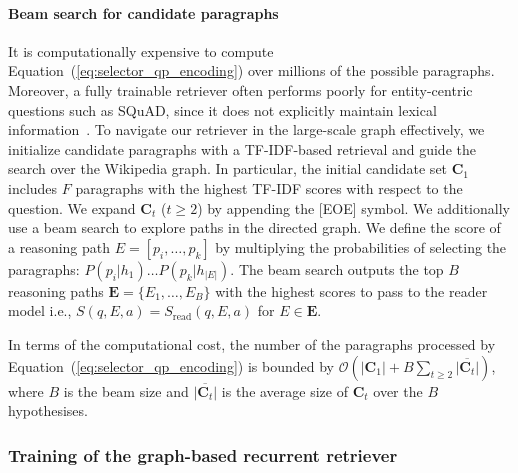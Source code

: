 \vspace{-2mm}\paragraph{Beam search for candidate paragraphs}
It is computationally expensive to compute Equation~(\ref{eq:selector_qp_encoding}) over millions of the possible paragraphs. Moreover, a fully trainable retriever often performs poorly for entity-centric questions such as SQuAD, since it does not explicitly maintain lexical information~\citep{lee-chang-toutanova:2019:ACL2019}.
To navigate our retriever in the large-scale graph effectively, we initialize candidate paragraphs with a TF-IDF-based retrieval and guide the search over the Wikipedia graph.
In particular, the initial candidate set $\mathbf{C}_1$ includes $F$ paragraphs with the highest TF-IDF scores with respect to the question.
We expand $\mathbf{C}_t$ ($t\geq 2$) by appending the [EOE] symbol.
We additionally use a beam search to explore paths in the directed graph.
We define the score of a reasoning path $E=[p_i, \ldots, p_k]$ by multiplying the probabilities  of selecting the paragraphs: $P(p_i|h_1)\ldots P(p_k|h_{|E|})$.
The beam search outputs the top $B$ reasoning paths $\mathbf{E}=\{E_1, \ldots, E_B\}$ with the highest scores to pass to the reader model i.e.,  $S(q, E, a) = S_\mathrm{read}(q, E, a)$ for $E\in\mathbf{E}$.

In terms of the computational cost, the number of the paragraphs processed by Equation~(\ref{eq:selector_qp_encoding}) is bounded by $\mathcal{O}(|\mathbf{C}_1|+B\sum_{t\geq2}\overline{|\mathbf{C}_t|})$, where $B$ is the beam size and $\overline{|\mathbf{C}_t|}$ is the average size of $\mathbf{C}_t$ over the $B$ hypothesises.

\subsubsection{Training of the graph-based recurrent retriever}
\label{subsubsec:training_selector}

